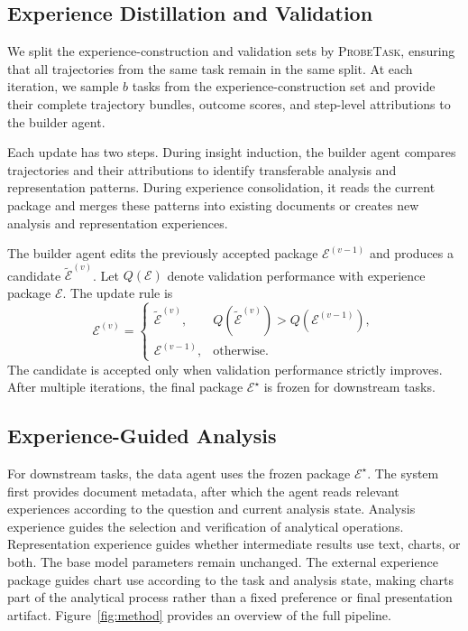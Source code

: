 \documentclass{article}
\newcommand{\probe}{\textsc{ProbeTask}}
\begin{document}
\subsection{Experience Distillation and Validation}
\label{sec:experience-learning}

We split the experience-construction and validation sets by \probe{}, ensuring that all trajectories from the same task remain in the same split.
At each iteration, we sample $b$ tasks from the experience-construction set and provide their complete trajectory bundles, outcome scores, and step-level attributions to the builder agent.

Each update has two steps.
During insight induction, the builder agent compares trajectories and their attributions to identify transferable analysis and representation patterns.
During experience consolidation, it reads the current package and merges these patterns into existing documents or creates new analysis and representation experiences.

The builder agent edits the previously accepted package $\mathcal{E}^{(v-1)}$ and produces a candidate $\widetilde{\mathcal{E}}^{(v)}$.
Let $Q(\mathcal{E})$ denote validation performance with experience package $\mathcal{E}$.
The update rule is
\begin{equation}
\mathcal{E}^{(v)}=
\begin{cases}
\widetilde{\mathcal{E}}^{(v)},
& Q(\widetilde{\mathcal{E}}^{(v)})
>Q(\mathcal{E}^{(v-1)}),\\[4pt]
\mathcal{E}^{(v-1)},
& \text{otherwise}.
\end{cases}
\label{eq:experience-gate}
\end{equation}
The candidate is accepted only when validation performance strictly improves.
After multiple iterations, the final package $\mathcal{E}^{\star}$ is frozen for downstream tasks.

\subsection{Experience-Guided Analysis}
\label{sec:online}

For downstream tasks, the data agent uses the frozen package $\mathcal{E}^{\star}$.
The system first provides document metadata, after which the agent reads relevant experiences according to the question and current analysis state.
Analysis experience guides the selection and verification of analytical operations.
Representation experience guides whether intermediate results use text, charts, or both.
The base model parameters remain unchanged.
The external experience package guides chart use according to the task and analysis state, making charts part of the analytical process rather than a fixed preference or final presentation artifact.
Figure~\ref{fig:method} provides an overview of the full pipeline.
\end{document}
